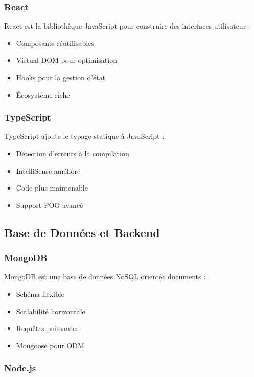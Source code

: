 \subsubsection{React}

React est la bibliothèque JavaScript pour construire des interfaces utilisateur :
\begin{itemize}
    \item Composants réutilisables
    \item Virtual DOM pour optimisation
    \item Hooks pour la gestion d'état
    \item Écosystème riche
\end{itemize}

\subsubsection{TypeScript}

TypeScript ajoute le typage statique à JavaScript :
\begin{itemize}
    \item Détection d'erreurs à la compilation
    \item IntelliSense amélioré
    \item Code plus maintenable
    \item Support POO avancé
\end{itemize}

\subsection{Base de Données et Backend}

\subsubsection{MongoDB}

MongoDB est une base de données NoSQL orientée documents :
\begin{itemize}
    \item Schéma flexible
    \item Scalabilité horizontale
    \item Requêtes puissantes
    \item Mongoose pour ODM
\end{itemize}

\subsubsection{Node.js}

